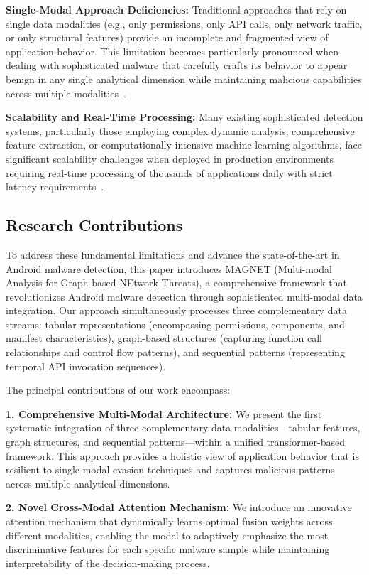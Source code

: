 \documentclass[a4paper,11pt]{article}
\begin{document}
\textbf{Single-Modal Approach Deficiencies:} Traditional approaches that rely on single data modalities (e.g., only permissions, only API calls, only network traffic, or only structural features) provide an incomplete and fragmented view of application behavior. This limitation becomes particularly pronounced when dealing with sophisticated malware that carefully crafts its behavior to appear benign in any single analytical dimension while maintaining malicious capabilities across multiple modalities~\cite{SingleModalLimitations2023}.

\textbf{Scalability and Real-Time Processing:} Many existing sophisticated detection systems, particularly those employing complex dynamic analysis, comprehensive feature extraction, or computationally intensive machine learning algorithms, face significant scalability challenges when deployed in production environments requiring real-time processing of thousands of applications daily with strict latency requirements~\cite{ScalabilityChallenge2023}.

\subsection{Research Contributions}

To address these fundamental limitations and advance the state-of-the-art in Android malware detection, this paper introduces MAGNET (Multi-modal Analysis for Graph-based NEtwork Threats), a comprehensive framework that revolutionizes Android malware detection through sophisticated multi-modal data integration. Our approach simultaneously processes three complementary data streams: tabular representations (encompassing permissions, components, and manifest characteristics), graph-based structures (capturing function call relationships and control flow patterns), and sequential patterns (representing temporal API invocation sequences).

The principal contributions of our work encompass:

\textbf{1. Comprehensive Multi-Modal Architecture:} We present the first systematic integration of three complementary data modalities—tabular features, graph structures, and sequential patterns—within a unified transformer-based framework. This approach provides a holistic view of application behavior that is resilient to single-modal evasion techniques and captures malicious patterns across multiple analytical dimensions.

\textbf{2. Novel Cross-Modal Attention Mechanism:} We introduce an innovative attention mechanism that dynamically learns optimal fusion weights across different modalities, enabling the model to adaptively emphasize the most discriminative features for each specific malware sample while maintaining interpretability of the decision-making process.
\end{document}
